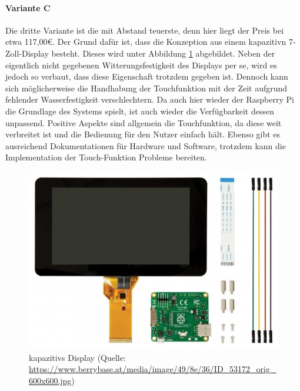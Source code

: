 \paragraph{Variante C}
Die dritte Variante ist die mit Abstand teuerste, denn hier liegt der Preis bei etwa 117,00€. Der Grund dafür ist, dass die Konzeption aus einem \gls{kapazitiv}n 7-Zoll-Display besteht. Dieses wird unter Abbildung \ref{fig:kapazitives_display} abgebildet. Neben der eigentlich nicht gegebenen Witterungsfestigkeit des Displays per se, wird es jedoch so verbaut, dass diese Eigenschaft trotzdem gegeben ist. Dennoch kann sich möglicherweise die Handhabung der Touchfunktion mit der Zeit aufgrund fehlender Wasserfestigkeit verschlechtern. Da auch hier wieder der Raspberry Pi die Grundlage des Systems spielt, ist auch wieder die Verfügbarkeit dessen unpassend. Positive Aspekte sind allgemein die Touchfunktion, da diese weit verbreitet ist und die Bedienung für den Nutzer einfach hält. Ebenso gibt es ausreichend Dokumentationen für Hardware und Software, trotzdem kann die Implementation der Touch-Funktion Probleme bereiten.
\begin{figure}[ht]
	\centering
	\includegraphics[width=0.6\linewidth]{Bilder/kapazitives_display.jpg}
	\caption{\gls{kapazitiv}s Display (Quelle: \url{https://www.berrybase.at/media/image/49/8e/36/ID_53172_orig_600x600.jpg})}
	\label{fig:kapazitives_display}
\end{figure}
\newpage
